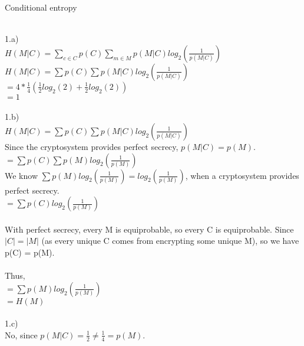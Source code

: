 \documentclass{assignment}
\begin{document}
\begin{problemlist}
\pbitem Conditional entropy
\begin{problem}
\begin{answer}
\\
1.a)\\
$H(M|C)=\sum_{c\in C}p(C)\sum_{m\in M}p(M|C)log_2(\frac{1}{p(M|C)})$\\
$H(M|C)=\sum p(C)\sum p(M|C)log_2(\frac{1}{p(M|C)})$\\
$=4*\frac{1}{4}(\frac{1}{2}log_2(2)+ \frac{1}{2}log_2(2))$\\
$=1$\\
\\
1.b)\\
$H(M|C)=\sum p(C)\sum p(M|C)log_2(\frac{1}{p(M|C)})$\\

Since the cryptosystem provides perfect secrecy, $p(M|C)=p(M)$.\\

$=\sum p(C)\sum p(M)log_2(\frac{1}{p(M)})$\\

We know $\sum p(M)log_2(\frac{1}{p(M)})=log_2(\frac{1}{p(M)})$, when a cryptosystem provides perfect secrecy. \\

$=\sum p(C)log_2(\frac{1}{p(M)})$\\
\\
With perfect secrecy, every M is equiprobable, so every C is equiprobable.
Since $|C| = |M|$  (as every unique C comes from encrypting some unique M), so we have
p(C) = p(M).\\
\\
Thus,\\

$=\sum p(M)log_2(\frac{1}{p(M)})$\\
$=H(M)$\\
\\
1.c)\\
No, since $p(M|C)=\frac{1}{2}\neq\frac{1}{4}=p(M)$.\\
\\
\end{answer}
\end{problem}


\end{problemlist}
\end{document}
